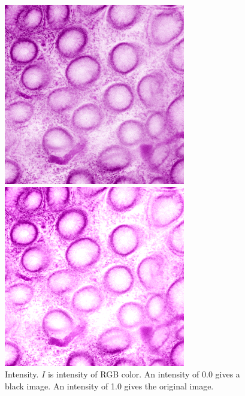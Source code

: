 \begin{figure}[H]
\begin{minipage}{0.25\columnwidth}
		\includegraphics[clip, width=\linewidth]{fig/preprocessing/data_aug/color/BRIGHTNESS/BRIGHTNESS_1_00}
	\end{minipage}
	\begin{minipage}{0.25\columnwidth}
		\centering
		\includegraphics[clip, width=\linewidth]{fig/preprocessing/data_aug/color/BRIGHTNESS/BRIGHTNESS_1_20}
	\end{minipage}
	
	\caption{Intensity. $I$ is intensity of RGB color. An intensity of 0.0 gives a black image. An intensity of 1.0 gives the original image.}
	\label{fig:輝度}

\end{figure}

